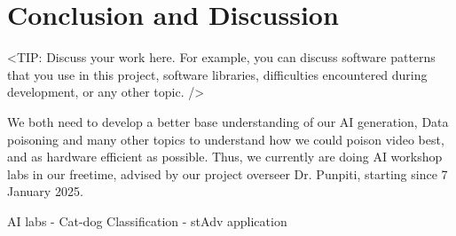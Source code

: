 \chapter{Conclusion and Discussion}
\label{chap:conclusion-discussion}

<TIP: Discuss your work here. For example, you can discuss software patterns
that you use in this project, software libraries, difficulties encountered during
development, or any other topic. />

We both need to develop a better base understanding of our AI generation, Data poisoning and many other topics to understand how we could poison video best, and as hardware efficient as possible.
Thus, we currently are doing AI workshop labs in our freetime, advised by our project overseer Dr. Punpiti, starting since 7 January 2025.

AI labs
- Cat-dog Classification
- stAdv application
